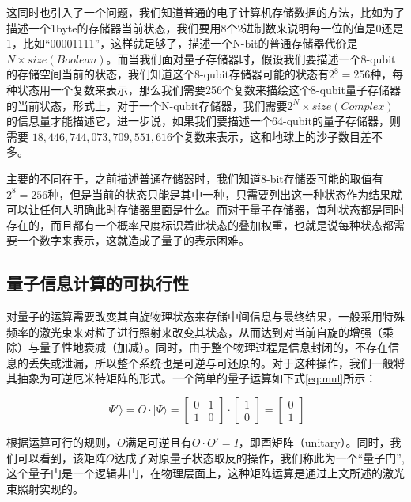 \documentclass[UTF8, 11pt, a4paper]{ctexart}
\begin{document}
这同时也引入了一个问题，我们知道普通的电子计算机存储数据的方法，比如为了描述一个1byte的存储器当前状态，我们要用8个2进制数来说明每一位的值是0还是1，比如“00001111”，这样就足够了，描述一个N-bit的普通存储器代价是$N \times size(Boolean)$。而当我们面对量子存储器时，假设我们要描述一个8-qubit的存储空间当前的状态，我们知道这个8-qubit存储器可能的状态有$2^8=256$种，每种状态用一个复数来表示，那么我们需要256个复数来描绘这个8-qubit量子存储器的当前状态，形式上，对于一个N-qubit存储器，我们需要$2^N \times size(Complex)$的信息量才能描述它，进一步说，如果我们要描述一个64-qubit的量子存储器，则需要 $18, 446, 744, 073, 709, 551, 616$个复数来表示，这和地球上的沙子数目差不多。

主要的不同在于，之前描述普通存储器时，我们知道8-bit存储器可能的取值有$2^8=256$种，但是当前的状态只能是其中一种，只需要列出这一种状态作为结果就可以让任何人明确此时存储器里面是什么。而对于量子存储器，每种状态都是同时存在的，而且都有一个概率尺度标识着此状态的叠加权重，也就是说每种状态都需要一个数字来表示，这就造成了量子的表示困难。

\subsection{量子信息计算的可执行性}

对量子的运算需要改变其自旋物理状态来存储中间信息与最终结果，一般采用特殊频率的激光束来对粒子进行照射来改变其状态，从而达到对当前自旋的增强（乘除）与量子性地衰减（加减）。同时，由于整个物理过程是信息封闭的，不存在信息的丢失或泄漏，所以整个系统也是可逆与可还原的。对于这种操作，我们一般将其抽象为可逆厄米特矩阵的形式。一个简单的量子运算如下式\ref{eq:mul}所示：

\begin{equation}
\label{eq:mul}
|\Psi ' \rangle = O \cdot  |\Psi \rangle = \left[\begin{array}{cc} 0 & 1 \\ 1 & 0 \end{array} \right ] \cdot  \left[\begin{array}{c}1 \\ 0 \end{array} \right ] = \left[\begin{array}{c}0 \\ 1 \end{array} \right ] 
\end{equation}

根据运算可行的规则，$O$满足可逆且有$O\cdot O'=I$，即酉矩阵（unitary）。同时，我们可以看到，该矩阵$O$达成了对原量子状态取反的操作，我们称此为一个“量子门”\cite{introq},这个量子门是一个逻辑非门，在物理层面上，这种矩阵运算是通过上文所述的激光束照射实现的。
\end{document}
